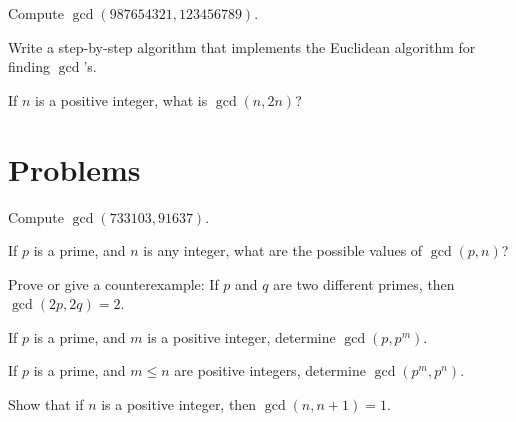 
\begin{exer}
Compute $\gcd(987654321,123456789)$.
\end{exer}

\begin{exer}
 Write a step-by-step  algorithm 
that implements the Euclidean algorithm for finding $\gcd$'s.
\end{exer}

\begin{exer}
If $n$ is a positive integer, what is $\gcd(n, 2n)$?
\end{exer}

\section{Problems}


\begin{prob}
Compute $\gcd(733103,91637)$.
\end{prob}

\begin{prob}
If $p$ is a prime, and $n$ is any integer, what are the
possible values of $\gcd(p,n)$?
\end{prob}

\begin{prob}
Prove or give a counterexample: If $p$ and $q$ are two different primes, then $\gcd(2p,2q) = 2$.
\end{prob}

\begin{prob}
If $p$ is a prime, and $m$ is a  positive integer, determine $\gcd(p, p^{m})$.
\end{prob}

\begin{prob}
If $p$ is a prime, and $m\leq n$ are positive integers, determine $\gcd(p^{m}, p^{n})$.
 \end{prob}
 
 \begin{prob}
 Show that if $n$ is a positive integer, then $\gcd(n, n+1) = 1$.
 \end{prob}

